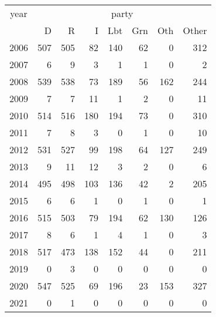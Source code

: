 \footnotesize\begin{tabular}[t]{lrrrrrrr}
\toprule
\multicolumn{1}{c}{year} & \multicolumn{7}{c}{party} \\
\cmidrule(l{3pt}r{3pt}){1-1} \cmidrule(l{3pt}r{3pt}){2-8}
  & D & R & I & Lbt & Grn & Oth & Other\\
\midrule
2006 & 507 & 505 & 82 & 140 & 62 & 0 & 312\\
2007 & 6 & 9 & 3 & 1 & 1 & 0 & 2\\
2008 & 539 & 538 & 73 & 189 & 56 & 162 & 244\\
2009 & 7 & 7 & 11 & 1 & 2 & 0 & 11\\
2010 & 514 & 516 & 180 & 194 & 73 & 0 & 310\\
2011 & 7 & 8 & 3 & 0 & 1 & 0 & 10\\
2012 & 531 & 527 & 99 & 198 & 64 & 127 & 249\\
2013 & 9 & 11 & 12 & 3 & 2 & 0 & 6\\
2014 & 495 & 498 & 103 & 136 & 42 & 2 & 205\\
2015 & 6 & 6 & 1 & 0 & 1 & 0 & 1\\
2016 & 515 & 503 & 79 & 194 & 62 & 130 & 126\\
2017 & 8 & 6 & 1 & 4 & 1 & 0 & 3\\
2018 & 517 & 473 & 138 & 152 & 44 & 0 & 211\\
2019 & 0 & 3 & 0 & 0 & 0 & 0 & 0\\
2020 & 547 & 525 & 69 & 196 & 23 & 153 & 327\\
2021 & 0 & 1 & 0 & 0 & 0 & 0 & 0\\
\bottomrule
\end{tabular}
